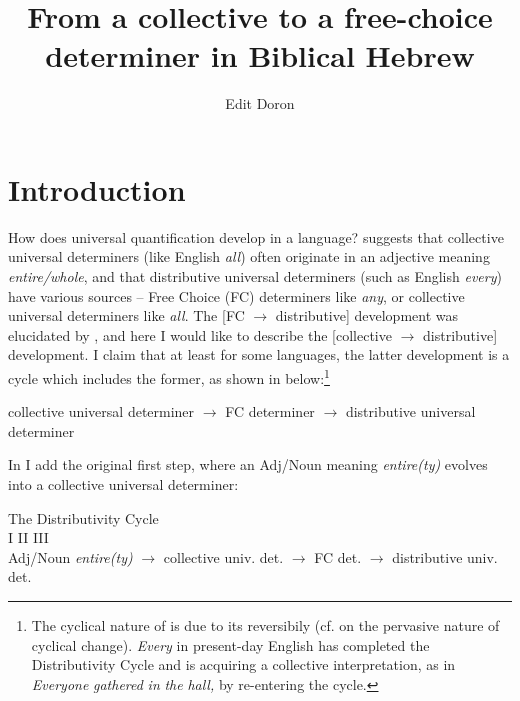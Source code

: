 \documentclass[output=paper]{langsci/langscibook}
\title{From a collective to a free-choice determiner in Biblical Hebrew}
\author{Edit Doron\affiliation{Hebrew University of Jerusalem}}
\begin{document}
\maketitle


\section{Introduction}

How does universal quantification develop in a language? \citet{Haspelmath1995}  suggests that collective universal determiners (like English \textit{all}) often originate in an adjective meaning \textit{entire/whole}, and that distributive universal determiners (such as English \textit{every}) have various sources – Free Choice (FC) determiners like \textit{any}, or collective universal determiners like \textit{all}. The [FC ${\rightarrow}$ distributive] development was elucidated by \citet{Beck2017}, and here I would like to describe the [collective ${\rightarrow}$ distributive] development. I claim that at least for some languages, the latter development is a cycle which includes the former, as shown in  below:\footnote{\textrm{The cyclical nature of  is due to its reversibily} (cf. \citet{Gelderen2011} on the pervasive nature of cyclical change). \textrm{\textit{Every}} \textrm{in present-day English} has completed the Distributivity Cycle and is acquiring a collective interpretation, as in \textit{Everyone} \textit{gathered} \textit{in} \textit{the} \textit{hall,} by re-entering the cycle.}  

\ea%
    \label{ex:doron:1}
            collective universal determiner  ${\rightarrow}$   FC determiner  ${\rightarrow}$  distributive universal determiner               
\z


In  I add the original first step, where an Adj/Noun meaning \textit{entire(ty)} \linebreak evolves into a collective universal determiner:

\ea%
    The Distributivity Cycle\label{ex:doron:2}\\
    \gll\relax                        {}                        I                 {}                    II         {}          III\\
                   {Adj/Noun \textit{entire(ty)}}  ${\rightarrow}$  {collective univ. det.}  
                   ${\rightarrow}$   {FC det.}  ${\rightarrow}$  {distributive univ. det.} \\
    \z
\end{document}
